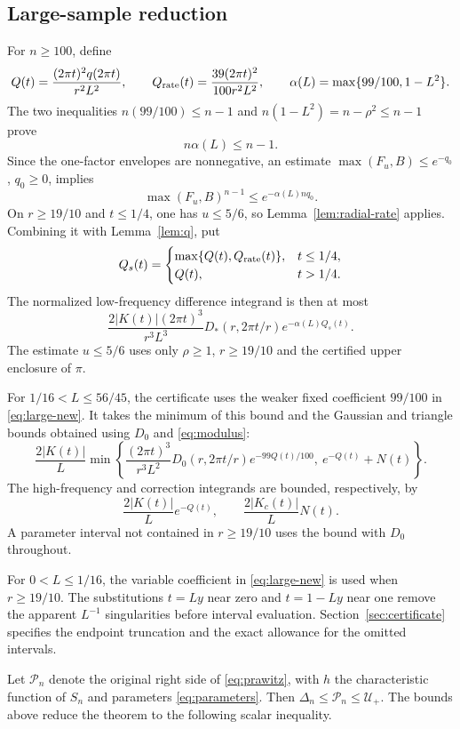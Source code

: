 \documentclass[11pt]{article}
\begin{document}
\subsection{Large-sample reduction}

For \(n\ge100\), define
\[
 Q(t)=\frac{(2\pi t)^2q(2\pi t)}{r^2L^2},\qquad
 Q_{\rm rate}(t)=\frac{39(2\pi t)^2}{100r^2L^2},\qquad
 \alpha(L)=\max\{99/100,1-L^2\}.
\]
The two inequalities \(n(99/100)\le n-1\) and
\(n(1-L^2)=n-\rho^2\le n-1\) prove
\[
 n\alpha(L)\le n-1.
 \label{eq:alpha}\tag{4.5}
\]
Since the one-factor envelopes are nonnegative, an estimate
\(\max(F_u,B)\le e^{-q_0}\), \(q_0\ge0\), implies
\[
 \max(F_u,B)^{n-1}\le e^{-\alpha(L)nq_0}.
\]
On \(r\ge19/10\) and \(t\le1/4\), one has
\(u\le5/6\), so Lemma~\ref{lem:radial-rate} applies. Combining it
with Lemma~\ref{lem:q}, put
\[
 Q_s(t)=
 \begin{cases}
 \max\{Q(t),Q_{\rm rate}(t)\},&t\le1/4,\\
 Q(t),&t>1/4.
 \end{cases}
\]
The normalized low-frequency difference integrand is then at most
\[
 \frac{2|K(t)|(2\pi t)^3}{r^3L^3}
 D_*(r,2\pi t/r)e^{-\alpha(L)Q_s(t)}.
 \label{eq:large-new}\tag{4.6}
\]
The estimate \(u\le5/6\) uses only \(\rho\ge1\), \(r\ge19/10\)
and the certified upper enclosure of \(\pi\).

For \(1/16<L\le56/45\), the certificate uses the weaker fixed
coefficient \(99/100\) in \eqref{eq:large-new}. It takes the minimum
of this bound and the Gaussian and triangle bounds obtained using
\(D_0\) and \eqref{eq:modulus}:
\[
 \frac{2|K(t)|}{L}\min\left\{
 \frac{(2\pi t)^3}{r^3L^2}D_0(r,2\pi t/r)e^{-99Q(t)/100},
 \ e^{-Q(t)}+N(t)\right\}.
\]
The high-frequency and correction integrands are bounded, respectively, by
\[
 \frac{2|K(t)|}{L}e^{-Q(t)},\qquad
 \frac{2|K_c(t)|}{L}N(t).
\]
A parameter interval not contained in \(r\ge19/10\) uses the bound with
\(D_0\) throughout.

For \(0<L\le1/16\), the variable coefficient in
\eqref{eq:large-new} is used when \(r\ge19/10\). The substitutions
\(t=Ly\) near zero and \(t=1-Ly\) near one remove the apparent
\(L^{-1}\) singularities before interval evaluation.
Section~\ref{sec:certificate} specifies the endpoint truncation and
the exact allowance for the omitted intervals.

Let \(\mathcal P_n\) denote the original right side of
\eqref{eq:prawitz}, with \(h\) the characteristic function of \(S_n\)
and parameters \eqref{eq:parameters}.
Then \(\Delta_n\le\mathcal P_n\le\mathcal U_+\).
The bounds above reduce the theorem to the following scalar inequality.
\end{document}
